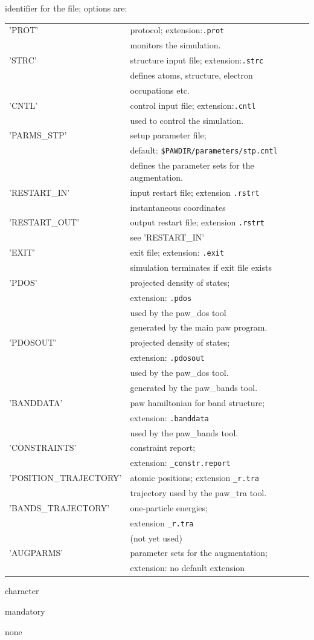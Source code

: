 \documentclass[final,12pt]{article}
\newcommand{\key}[1]{\hfill\break \makebox[1.5in][l]{\bf #1}\hfill\break}
\newcommand{\vdescr}[1]{\makebox[1in][l]{}\parbox[t]{110mm}{#1}\hfill\break}
\newcommand{\vformat}[1]{
\makebox[1in][l]{}\parbox[t]{110mm}{\makebox[1in][l]{Type:}\parbox[t]{2.7in}{#1}}
\hfill\break}
\newcommand{\vrules}[1]{
\makebox[1in][l]{}\parbox[t]{110mm}{\makebox[1in][l]{Rules:}\parbox[t]{2.7in}{#1}}
\hfill\break}
\newcommand{\vdefault}[1]{
\makebox[1in][l]{}\parbox[t]{110mm}
{\makebox[1in][l]{Default:}\parbox[t]{2.7in}{#1}}
\hfill\break}
\newcommand{\mbax}[1]{#1}
\begin{document}
\newpage
\mbax{\key{ID}
\vdescr{identifier for the file; options are:\hfill\break 
\noindent
\begin{tabular}{|l|l|}
\hline
'PROT'& protocol; extension:{\tt .prot}\\
&monitors the simulation.\\
\hline
'STRC'& structure input file; extension:{\tt .strc}\\
& defines atoms, structure, electron \\
&occupations etc.\\
\hline
'CNTL'& control input file; extension:{\tt .cntl}\\
&used to control the simulation.\\
\hline
'PARMS\_STP'& setup parameter file; \\
&default: {\tt \$PAWDIR/parameters/stp.cntl}\\
&defines the parameter sets for the augmentation.\\
\hline
'RESTART\_IN'& input restart file; extension {\tt .rstrt}\\
&instantaneous coordinates\\
\hline
'RESTART\_OUT'& output restart file; extension {\tt .rstrt}\\
&see 'RESTART\_IN'\\
\hline
'EXIT'& exit file; extension: {\tt .exit}\\
& simulation terminates if exit file exists\\
\hline
'PDOS'& projected density of states;\\
& extension: {\tt .pdos}\\
& used by the paw\_dos tool\\
& generated by the main paw program.\\
\hline
'PDOSOUT'& projected density of states;\\
& extension: {\tt .pdosout}\\
& used by the paw\_dos tool.\\
& generated by the paw\_bands tool.\\
\hline
'BANDDATA'& paw hamiltonian for band structure;\\
& extension: {\tt .banddata}\\
& used by the paw\_bands tool.\\
\hline
'CONSTRAINTS'& constraint report;\\
& extension: {\tt \_constr.report}\\
\hline
'POSITION\_TRAJECTORY'& atomic positions; 
extension {\tt \_r.tra}\\
&trajectory used by the paw\_tra tool.\\
\hline
'BANDS\_TRAJECTORY'& one-particle energies;\\
&extension {\tt \_r.tra}\\
&(not yet used)\\
\hline
'AUGPARMS'& parameter sets for the augmentation;\\
&extension: no default extension\\
\hline
\end{tabular}
}
\vformat{character} 
\vrules{mandatory}
\vdefault{none}}
\end{document}
